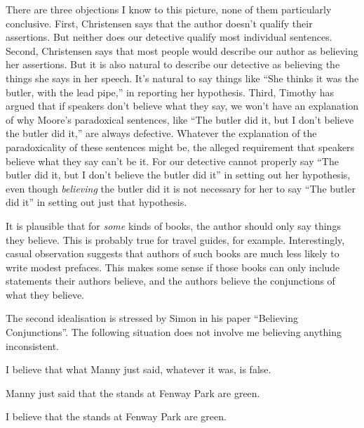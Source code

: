 There are three objections I know to this picture, none of them particularly conclusive. First, Christensen says that the author doesn't qualify their assertions. But neither does our detective qualify most individual sentences. Second, Christensen says that most people would describe our author as believing her assertions. But it is also natural to describe our detective as believing the things she says in her speech. It's natural to say things like ``She thinks it was the butler, with the lead pipe,'' in reporting her hypothesis. Third, Timothy \cite{Williamson2000-WILKAI} has argued that if speakers don't believe what they say, we won't have an explanation of why Moore's paradoxical sentences, like ``The butler did it, but I don't believe the butler did it,'' are always defective. Whatever the explanation of the paradoxicality of these sentences might be, the alleged requirement that speakers believe what they say can't be it. For our detective cannot properly say ``The butler did it, but I don't believe the butler did it'' in setting out her hypothesis, even though \textit{believing} the butler did it is not necessary for her to say ``The butler did it'' in setting out just that hypothesis.

It is plausible that for \textit{some} kinds of books, the author should only say things they believe. This is probably true for travel guides, for example. Interestingly, casual observation suggests that authors of such books are much less likely to write modest prefaces. This makes some sense if those books can only include statements their authors believe, and the authors believe the conjunctions of what they believe.

The second idealisation is stressed by Simon \citeauthor{Evnine1999} in his paper ``Believing Conjunctions''. The following situation does not involve me believing anything inconsistent. 

\begin{itemize*}
\item I believe that what Manny just said, whatever it was, is false. 
\item Manny just said that the stands at Fenway Park are green. 
\item I believe that the stands at Fenway Park are green. 
\end{itemize*}

